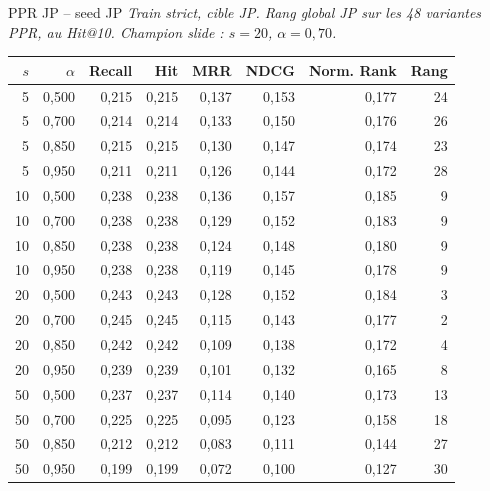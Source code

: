 \documentclass[aspectratio=169,10pt]{beamer}
\begin{document}
\begin{frame}{PPR JP -- seed JP}
  \tiny
  \textit{Train strict, cible JP. Rang global JP sur les 48 variantes PPR, au Hit@10. Champion slide : $s=20$, $\alpha=0{,}70$.}

  \vspace{0.15em}
  \begin{center}
  \renewcommand{\arraystretch}{0.95}
  \setlength{\tabcolsep}{3pt}
  \begin{tabular}{@{}r r r r r r r r@{}}
    \toprule
    $s$ & $\alpha$ & Recall & Hit & MRR & NDCG & Norm. Rank & Rang \\
    \midrule
    5 & 0,500 & 0,215 & 0,215 & 0,137 & 0,153 & 0,177 & 24 \\
    5 & 0,700 & 0,214 & 0,214 & 0,133 & 0,150 & 0,176 & 26 \\
    5 & 0,850 & 0,215 & 0,215 & 0,130 & 0,147 & 0,174 & 23 \\
    5 & 0,950 & 0,211 & 0,211 & 0,126 & 0,144 & 0,172 & 28 \\
    10 & 0,500 & 0,238 & 0,238 & 0,136 & 0,157 & 0,185 & 9 \\
    10 & 0,700 & 0,238 & 0,238 & 0,129 & 0,152 & 0,183 & 9 \\
    10 & 0,850 & 0,238 & 0,238 & 0,124 & 0,148 & 0,180 & 9 \\
    10 & 0,950 & 0,238 & 0,238 & 0,119 & 0,145 & 0,178 & 9 \\
    20 & 0,500 & 0,243 & 0,243 & 0,128 & 0,152 & 0,184 & 3 \\
    \rowcolor{accentsoft}
    20 & 0,700 & 0,245 & 0,245 & 0,115 & 0,143 & 0,177 & 2 \\
    20 & 0,850 & 0,242 & 0,242 & 0,109 & 0,138 & 0,172 & 4 \\
    20 & 0,950 & 0,239 & 0,239 & 0,101 & 0,132 & 0,165 & 8 \\
    50 & 0,500 & 0,237 & 0,237 & 0,114 & 0,140 & 0,173 & 13 \\
    50 & 0,700 & 0,225 & 0,225 & 0,095 & 0,123 & 0,158 & 18 \\
    50 & 0,850 & 0,212 & 0,212 & 0,083 & 0,111 & 0,144 & 27 \\
    50 & 0,950 & 0,199 & 0,199 & 0,072 & 0,100 & 0,127 & 30 \\
    \bottomrule
  \end{tabular}
  \end{center}
\end{frame}
\end{document}
